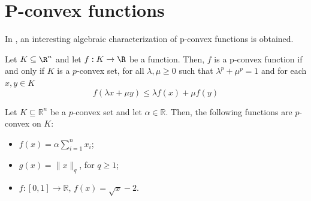 \documentclass[10pt]{article}
\begin{document}
\section{P-convex functions}
In \cite{SETA}, an interesting algebraic characterization of p-convex functions is obtained.
\begin{theorem} Let $K\subseteq \R^{n}$ and let $f:K\rightarrow \R$ be a function. Then, $f$ is a
p-convex function if and only if $K$ is a $p$-convex set, for all $\lambda,\mu\geq 0$ such
that $\lambda^{p}+\mu^{p}=1$ and for each $x,y\in K$
\begin{equation}
f(\lambda x+\mu y)\leq \lambda f(x)+\mu f(y)
\label{Convex function}
\end{equation}
\end{theorem}
\begin{example}
Let $K \subseteq \mathbb{R}^{n}$ be a $p$-convex set and let $\alpha \in \mathbb{R}$. Then, the following functions are $p$-convex on $K$:
\begin{itemize}
\item[$(a)$] $\displaystyle f(x) = \alpha \sum_{i=1}^{n} x_i$;
\item[$(b)$] $\displaystyle g(x) = \|x\|_q$, for $q \ge 1$;
\item[$(c)$] $f : [0,1] \to \mathbb{R}$, $f(x) = \sqrt{x} - 2.$
\end{itemize}
\end{example}
\end{document}

